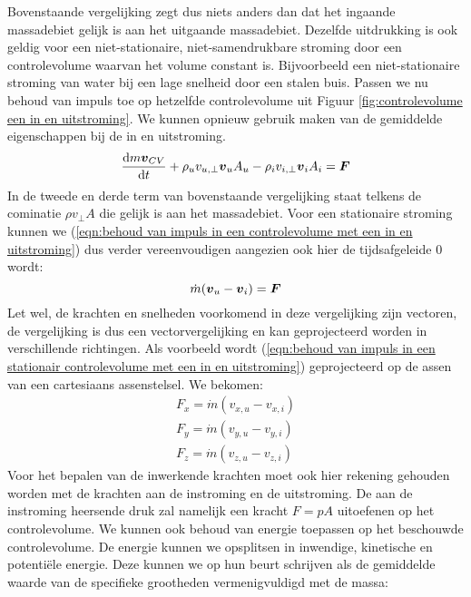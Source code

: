 Bovenstaande vergelijking zegt dus niets anders dan dat het ingaande massadebiet gelijk is aan het uitgaande massadebiet. Dezelfde uitdrukking is ook geldig voor een niet-stationaire, niet-samendrukbare stroming door een controlevolume waarvan het volume constant is. Bijvoorbeeld een niet-stationaire stroming van water bij een lage snelheid door een stalen buis.
\npar
Passen we nu behoud van impuls toe op hetzelfde controlevolume uit Figuur \ref{fig:controlevolume een in en uitstroming}. We kunnen opnieuw gebruik maken van de gemiddelde eigenschappen bij de in en uitstroming.
\begin{equation}
	 \dfrac{\mathrm{d} m \boldsymbol{v}_{CV}}{\mathrm{d} t} + \rho_{u} v_{u,\perp} \boldsymbol{v}_{u} A_{u} - \rho_{i} v_{i,\perp} \boldsymbol{v}_{i} A_{i} = \boldsymbol{F}
	\label{eqn:behoud van impuls in een controlevolume met een in en uitstroming}
\end{equation}
In de tweede en derde term van bovenstaande vergelijking staat telkens de cominatie $\rho v_{\perp} A$ die gelijk is aan het massadebiet. Voor een stationaire stroming kunnen we (\ref{eqn:behoud van impuls in een controlevolume met een in en uitstroming}) dus verder vereenvoudigen aangezien ook hier de tijdsafgeleide $0$ wordt:
\begin{equation}
	\dot{m} (\boldsymbol{v}_u-\boldsymbol{v}_i) = \boldsymbol{F}
	\label{eqn:behoud van impuls in een stationair controlevolume met een in en uitstroming}
\end{equation}
Let wel, de krachten en snelheden voorkomend in deze vergelijking zijn vectoren, de vergelijking is dus een vectorvergelijking en kan geprojecteerd worden in verschillende richtingen. Als voorbeeld wordt (\ref{eqn:behoud van impuls in een stationair controlevolume met een in en uitstroming}) geprojecteerd op de assen van een cartesiaans assenstelsel. We bekomen:
\begin{eqnarray}
	F_x = \dot{m} (v_{x,u}-v_{x,i}) \nonumber \\
	F_y = \dot{m} (v_{y,u}-v_{y,i}) \\
	F_z = \dot{m} (v_{z,u}-v_{z,i}) \nonumber
	\label{eqn:behoud van impuls in een stationair controlevolume met een in en uitstroming geprojecteerd}
\end{eqnarray}
Voor het bepalen van de inwerkende krachten moet ook hier rekening gehouden worden met de krachten aan de instroming en de uitstroming. De aan de instroming heersende druk zal namelijk een kracht $F = p A$ uitoefenen op het controlevolume.
\npar
We kunnen ook behoud van energie toepassen op het beschouwde controlevolume. De energie kunnen we opsplitsen in inwendige, kinetische en potenti\"ele energie. Deze kunnen we op hun beurt schrijven als de gemiddelde waarde van de specifieke grootheden vermenigvuldigd met de massa:
